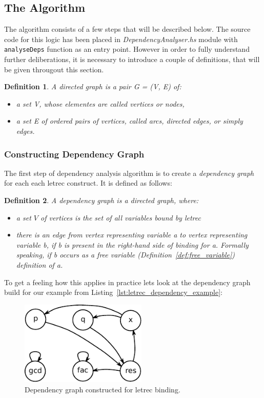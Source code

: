 \documentclass[12pt,a4paper]{report}
\newtheorem{definition}{Definition}[chapter]
\begin{document}
\subsection{The Algorithm}
The algorithm consists of a few steps that will be described below. The source
code for this logic has been placed in \textit{DependencyAnalyser.hs} module
with \texttt{analyseDeps} function as an entry point. However in order to fully
understand further deliberations, it is necessary to introduce a couple of
definitions, that will be given througout this section.
\begin{definition}
A directed graph is a pair G = (V, E) of:
\begin{itemize}
  \item a set V, whose elementes are called vertices or nodes,
  \item a set E of ordered pairs of vertices, called arcs, directed edges, or
    simply edges.
\end{itemize}
\end{definition}

\subsubsection{Constructing Dependency Graph}
The first step of dependency analysis algorithm is to create a
\textit{dependency graph} for each each letrec construct. It is
defined as follows:
\begin{definition}
A dependency graph is a directed graph, where:
\begin{itemize}
  \item a set $V$ of vertices is the set of all variables bound by
    letrec
  \item there is an edge from vertex representing variable a to vertex
    representing variable b, if b is present in the right-hand side of
    binding for a. Formally speaking, if b occurs as a free variable
    (Definition~\ref{def:free_variable}) definition of a.
\end{itemize}
\end{definition}

To get a feeling how this applies in practice lets look at the dependency graph
build for our example from Listing~\ref{lst:letrec_dependency_example}:

\vspace*{0.2in}
\begin{figure}[h!]
  \centering
  \includegraphics[height=4cm]{dependency_graph}
  \caption{Dependency graph constructed for letrec binding.}
  \label{fig:letrec_dependency_graph}
\end{figure}
\end{document}

